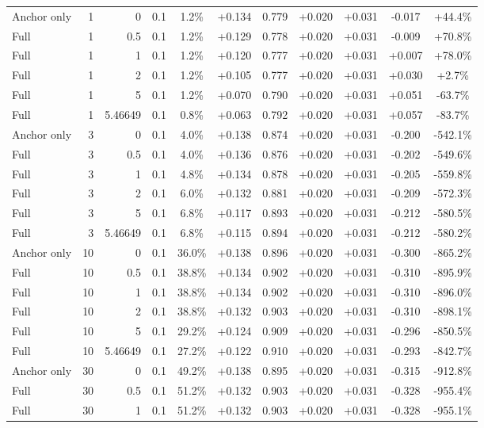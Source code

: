 \begin{table}[htbp]
\begin{tabular}{lrrrccccccc}
Anchor only & 1 & 0 & 0.1 & 1.2\% & +0.134 & 0.779 & +0.020 & +0.031 & -0.017 & +44.4\% \\
Full & 1 & 0.5 & 0.1 & 1.2\% & +0.129 & 0.778 & +0.020 & +0.031 & -0.009 & +70.8\% \\
Full & 1 & 1 & 0.1 & 1.2\% & +0.120 & 0.777 & +0.020 & +0.031 & +0.007 & +78.0\% \\
Full & 1 & 2 & 0.1 & 1.2\% & +0.105 & 0.777 & +0.020 & +0.031 & +0.030 & +2.7\% \\
Full & 1 & 5 & 0.1 & 1.2\% & +0.070 & 0.790 & +0.020 & +0.031 & +0.051 & -63.7\% \\
Full & 1 & 5.46649 & 0.1 & 0.8\% & +0.063 & 0.792 & +0.020 & +0.031 & +0.057 & -83.7\% \\
Anchor only & 3 & 0 & 0.1 & 4.0\% & +0.138 & 0.874 & +0.020 & +0.031 & -0.200 & -542.1\% \\
Full & 3 & 0.5 & 0.1 & 4.0\% & +0.136 & 0.876 & +0.020 & +0.031 & -0.202 & -549.6\% \\
Full & 3 & 1 & 0.1 & 4.8\% & +0.134 & 0.878 & +0.020 & +0.031 & -0.205 & -559.8\% \\
Full & 3 & 2 & 0.1 & 6.0\% & +0.132 & 0.881 & +0.020 & +0.031 & -0.209 & -572.3\% \\
Full & 3 & 5 & 0.1 & 6.8\% & +0.117 & 0.893 & +0.020 & +0.031 & -0.212 & -580.5\% \\
Full & 3 & 5.46649 & 0.1 & 6.8\% & +0.115 & 0.894 & +0.020 & +0.031 & -0.212 & -580.2\% \\
Anchor only & 10 & 0 & 0.1 & 36.0\% & +0.138 & 0.896 & +0.020 & +0.031 & -0.300 & -865.2\% \\
Full & 10 & 0.5 & 0.1 & 38.8\% & +0.134 & 0.902 & +0.020 & +0.031 & -0.310 & -895.9\% \\
Full & 10 & 1 & 0.1 & 38.8\% & +0.134 & 0.902 & +0.020 & +0.031 & -0.310 & -896.0\% \\
Full & 10 & 2 & 0.1 & 38.8\% & +0.132 & 0.903 & +0.020 & +0.031 & -0.310 & -898.1\% \\
Full & 10 & 5 & 0.1 & 29.2\% & +0.124 & 0.909 & +0.020 & +0.031 & -0.296 & -850.5\% \\
Full & 10 & 5.46649 & 0.1 & 27.2\% & +0.122 & 0.910 & +0.020 & +0.031 & -0.293 & -842.7\% \\
Anchor only & 30 & 0 & 0.1 & 49.2\% & +0.138 & 0.895 & +0.020 & +0.031 & -0.315 & -912.8\% \\
Full & 30 & 0.5 & 0.1 & 51.2\% & +0.132 & 0.903 & +0.020 & +0.031 & -0.328 & -955.4\% \\
Full & 30 & 1 & 0.1 & 51.2\% & +0.132 & 0.903 & +0.020 & +0.031 & -0.328 & -955.1\% \\

\end{tabular}
\end{table}
